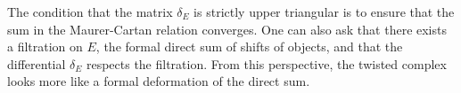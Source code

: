 

The condition that the matrix $\delta_E$ is strictly upper triangular is to ensure that the sum in the Maurer-Cartan relation converges. One can also ask that there exists a filtration on $E$, the formal direct sum of shifts of objects, and that the differential $\delta_E$ respects the filtration. From this perspective, the twisted complex looks more like a formal deformation of the direct sum.
 